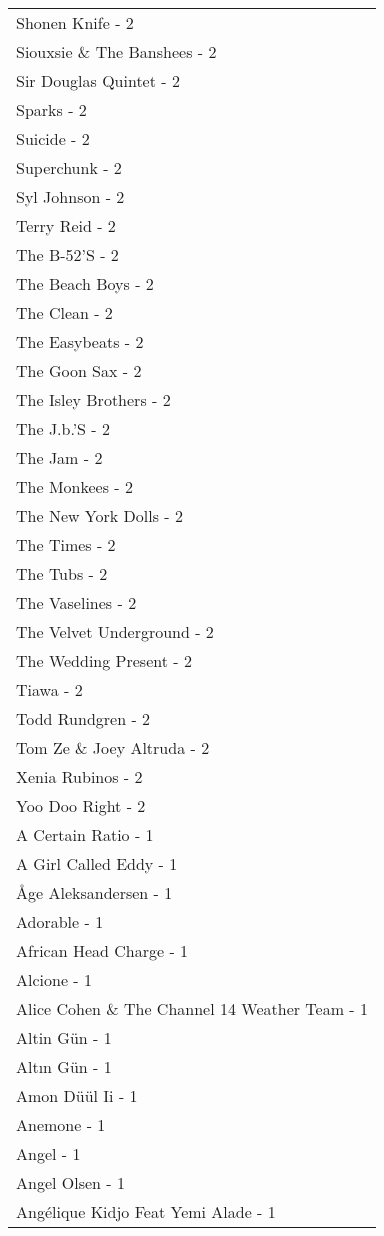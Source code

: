 \documentclass[
]{article}
\begin{document}
\begin{longtable}{l}
Shonen Knife - 2 \\ 
Siouxsie \& The Banshees - 2 \\ 
Sir Douglas Quintet - 2 \\ 
Sparks - 2 \\ 
Suicide - 2 \\ 
Superchunk - 2 \\ 
Syl Johnson - 2 \\ 
Terry Reid - 2 \\ 
The B-52’S - 2 \\ 
The Beach Boys - 2 \\ 
The Clean - 2 \\ 
The Easybeats - 2 \\ 
The Goon Sax - 2 \\ 
The Isley Brothers - 2 \\ 
The J.b.'S - 2 \\ 
The Jam - 2 \\ 
The Monkees - 2 \\ 
The New York Dolls - 2 \\ 
The Times - 2 \\ 
The Tubs - 2 \\ 
The Vaselines - 2 \\ 
The Velvet Underground - 2 \\ 
The Wedding Present - 2 \\ 
Tiawa - 2 \\ 
Todd Rundgren - 2 \\ 
Tom Ze \& Joey Altruda - 2 \\ 
Xenia Rubinos - 2 \\ 
Yoo Doo Right - 2 \\ 
A Certain Ratio - 1 \\ 
A Girl Called Eddy - 1 \\ 
Åge Aleksandersen - 1 \\ 
Adorable - 1 \\ 
African Head Charge - 1 \\ 
Alcione - 1 \\ 
Alice Cohen \& The Channel 14 Weather Team - 1 \\ 
Altin Gün - 1 \\ 
Altın Gün - 1 \\ 
Amon Düül Ii - 1 \\ 
Anemone - 1 \\ 
Angel - 1 \\ 
Angel Olsen - 1 \\ 
Angélique Kidjo Feat Yemi Alade - 1 \\ 

\end{longtable}
\end{document}
